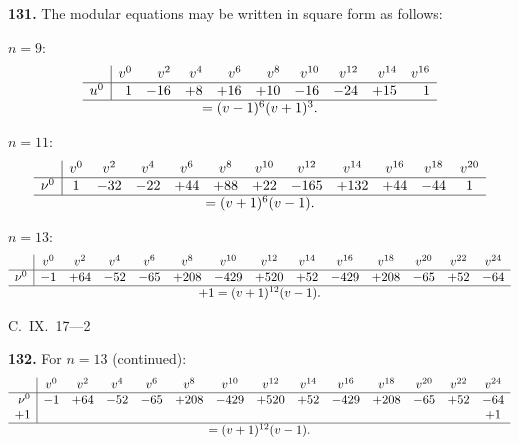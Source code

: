 \documentclass[11pt,a4paper]{article}
\theoremstyle{plain}
\begin{document}
\newpage
\noindent\textbf{131.} The modular equations may be written in square form as follows:

\medskip
$n = 9$:
\[
\begin{array}{r|rrrrrrrrr}
& v^0 & v^2 & v^4 & v^6 & v^8 & v^{10} & v^{12} & v^{14} & v^{16} \\
\hline
u^0 & 1 & -16 & +8 & +16 & +10 & -16 & -24 & +15 & 1 \\
\hline
\multicolumn{10}{c}{= (v - 1)^6(v + 1)^3.}
\end{array}
\]

\medskip
$n = 11$:
\[
\begin{array}{r|ccccccccccc}
& v^0 & v^2 & v^4 & v^6 & v^8 & v^{10} & v^{12} & v^{14} & v^{16} & v^{18} & v^{20} \\
\hline
\nu^0 & 1 & -32 & -22 & +44 & +88 & +22 & -165 & +132 & +44 & -44 & 1 \\
\hline
\multicolumn{12}{c}{= (v + 1)^6(v - 1).}
\end{array}
\]

\medskip
$n = 13$:
\[
\begin{array}{r|ccccccccccccc}
& v^0 & v^2 & v^4 & v^6 & v^8 & v^{10} & v^{12} & v^{14} & v^{16} & v^{18} & v^{20} & v^{22} & v^{24} \\
\hline
\nu^0 & -1 & +64 & -52 & -65 & +208 & -429 & +520 & +52 & -429 & +208 & -65 & +52 & -64 \\
\hline
\multicolumn{14}{c}{+ 1 = (v + 1)^{12}(v - 1).}
\end{array}
\]

\begin{flushright}
C.~IX.~17---2
\end{flushright}


\noindent\textbf{132.} For $n = 13$ (continued):
\[
\begin{array}{r|ccccccccccccc}
& v^0 & v^2 & v^4 & v^6 & v^8 & v^{10} & v^{12} & v^{14} & v^{16} & v^{18} & v^{20} & v^{22} & v^{24} \\
\hline
\nu^0 & -1 & +64 & -52 & -65 & +208 & -429 & +520 & +52 & -429 & +208 & -65 & +52 & -64 \\
+1 & & & & & & & & & & & & & +1 \\
\hline
\multicolumn{14}{c}{= (v + 1)^{12}(v - 1).}
\end{array}
\]
\end{document}
